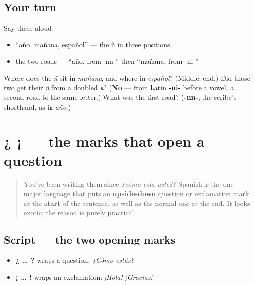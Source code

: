 \subsection*{Your turn}
Say these aloud:

\begin{itemize}
\raggedright
  \item \textquotedblleft{}año, mañana, español\textquotedblright{} — the ñ in three positions
  \item the two roads — \textquotedblleft{}año, from -nn-\textquotedblright{} then \textquotedblleft{}mañana, from -ni-\textquotedblright{}
\end{itemize}

\begin{tcolorbox}[breakable,colback=teal!4,colframe=teal!35!black,title={Before you move on}]
Where does the \emph{ñ} sit in \emph{mañana}, and where in \emph{español}? (Middle; end.) Did those two get their \emph{ñ} from a doubled \emph{n}? (\textbf{No} — from Latin \textbf{-ni-} before a vowel, a second road to the same letter.) What was the first road? (\textbf{-nn-}, the scribe's shorthand, as in \emph{año}.)
\end{tcolorbox}
\section[¿ ¡]{¿ ¡ — the marks that open a question}

\label{lesson:ES-W03-inverted}



\begin{quote}
You've been writing them since \emph{¿cómo está usted?} Spanish is the one major language that puts an \textbf{upside-down} question or exclamation mark at the \textbf{start} of the sentence, as well as the normal one at the end. It looks exotic; the reason is purely practical.
\end{quote}

\subsection*{Script — the two opening marks}
\begin{itemize}
\raggedright
  \item \textbf{¿ … ?} wraps a question: \emph{¿Cómo estás?}
  \item \textbf{¡ … !} wraps an exclamation: \emph{¡Hola!} \emph{¡Gracias!}
\end{itemize}

